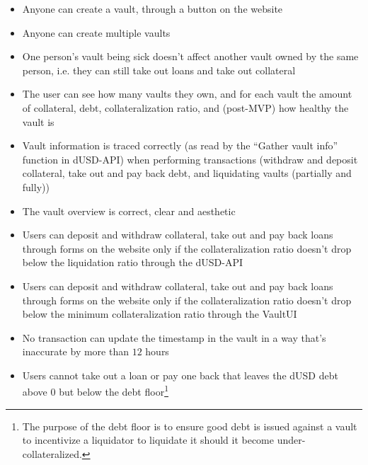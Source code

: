 \documentclass{article} %
\begin{document}
\begin{itemize}
  \item Anyone can create a vault, through a button on the website
  \item Anyone can create multiple vaults
  \item One person's vault being sick doesn't affect another vault owned by the
    same person, i.e. they can still take out loans and take out collateral
  \item The user can see how many vaults they own, and for each vault the amount
    of collateral, debt, collateralization ratio, and (post-MVP) how healthy the
    vault is
  \item Vault information is traced correctly (as read by the ``Gather vault
    info'' function in dUSD-API) when performing transactions (withdraw and
    deposit collateral, take out and pay back debt, and liquidating vaults
    (partially and fully))
  \item The vault overview is correct, clear and aesthetic
  \item Users can deposit and withdraw collateral, take out and pay back loans
    through forms on the website only if the collateralization ratio doesn't
    drop below the liquidation ratio through the dUSD-API
  \item Users can deposit and withdraw collateral, take out and pay back loans
    through forms on the website only if the collateralization ratio doesn't
    drop below the minimum collateralization ratio through the VaultUI
  \item No transaction can update the timestamp in the vault in a way that's
    inaccurate by more than $12$ hours
  \item Users cannot take out a loan or pay one back that leaves the dUSD debt
    above $0$ but below the debt floor\footnote{
    The purpose of the debt floor is to ensure good debt is issued against a
    vault to incentivize a liquidator to liquidate it should it become
    under-collateralized.}

\end{itemize}
\end{document}
